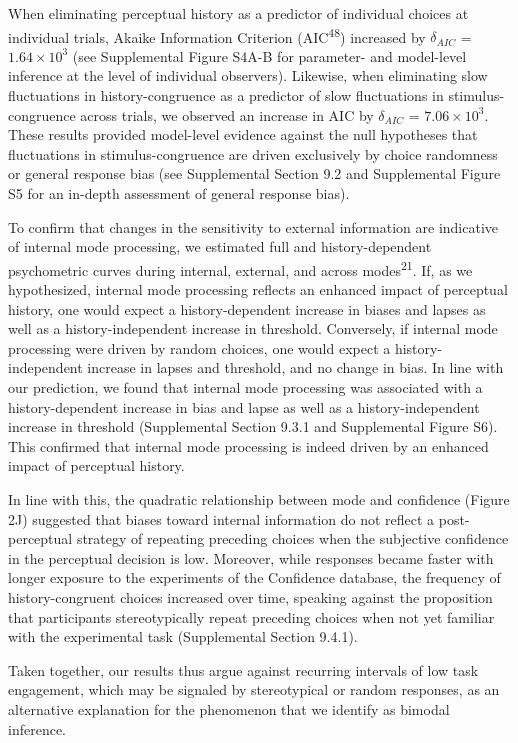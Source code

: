 \documentclass[
]{article}
\begin{document}
When eliminating perceptual history as a predictor of individual choices
at individual trials, Akaike Information Criterion
(AIC\textsuperscript{48}) increased by \(\delta_{AIC}\) =
\(\ensuremath{1.64\times 10^{3}}\) (see Supplemental Figure S4A-B for
parameter- and model-level inference at the level of individual
observers). Likewise, when eliminating slow fluctuations in
history-congruence as a predictor of slow fluctuations in
stimulus-congruence across trials, we observed an increase in AIC by
\(\delta_{AIC}\) = \(\ensuremath{7.06\times 10^{3}}\). These results
provided model-level evidence against the null hypotheses that
fluctuations in stimulus-congruence are driven exclusively by choice
randomness or general response bias (see Supplemental Section 9.2 and
Supplemental Figure S5 for an in-depth assessment of general response
bias).

To confirm that changes in the sensitivity to external information are
indicative of internal mode processing, we estimated full and
history-dependent psychometric curves during internal, external, and
across modes\textsuperscript{21}. If, as we hypothesized, internal mode
processing reflects an enhanced impact of perceptual history, one would
expect a history-dependent increase in biases and lapses as well as a
history-independent increase in threshold. Conversely, if internal mode
processing were driven by random choices, one would expect a
history-independent increase in lapses and threshold, and no change in
bias. In line with our prediction, we found that internal mode
processing was associated with a history-dependent increase in bias and
lapse as well as a history-independent increase in threshold
(Supplemental Section 9.3.1 and Supplemental Figure S6). This confirmed
that internal mode processing is indeed driven by an enhanced impact of
perceptual history.

In line with this, the quadratic relationship between mode and
confidence (Figure 2J) suggested that biases toward internal information
do not reflect a post-perceptual strategy of repeating preceding choices
when the subjective confidence in the perceptual decision is low.
Moreover, while responses became faster with longer exposure to the
experiments of the Confidence database, the frequency of
history-congruent choices increased over time, speaking against the
proposition that participants stereotypically repeat preceding choices
when not yet familiar with the experimental task (Supplemental Section
9.4.1).

Taken together, our results thus argue against recurring intervals of
low task engagement, which may be signaled by stereotypical or random
responses, as an alternative explanation for the phenomenon that we
identify as bimodal inference.
\end{document}
